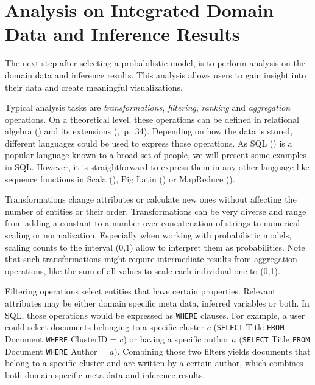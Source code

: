 \section{Analysis on Integrated Domain Data and Inference Results}

The next step after selecting a probabilistic model, is to perform analysis on the domain data and inference results. This analysis allows users to gain insight into their data and create meaningful visualizations.

Typical analysis tasks are \emph{transformations}, \emph{filtering}, \emph{ranking} and \emph{aggregation} operations. On a theoretical level, these operations can be defined in relational algebra (\cite{ozsoyouglu1987extending, klug1982equivalence}) and its extensions (\cite{rajaraman2011mining},~p.~34). Depending on how the data is stored, different languages could be used to express those operations. As SQL (\cite{iso2011sql}) is a popular language known to a broad set of people, we will present some examples in SQL. However, it is straightforward to express them in any other language like sequence functions in Scala (\cite{odersky2008programming}), Pig Latin (\cite{gates2011programming}) or MapReduce (\cite{dean2008mapreduce}).

Transformations change attributes or calculate new ones without affecting the number of entities or their order. Transformations can be very diverse and range from adding a constant to a number over concatenation of strings to numerical scaling or normalization. Especially when working with probabilistic models, scaling counts to the interval (0,1) allow to interpret them as probabilities. Note that such transformations might require intermediate results from aggregation operations, like the sum of all values to scale each individual one to (0,1).

Filtering operations select entities that have certain properties. Relevant attributes may be either domain specific meta data, inferred variables or both. In SQL, those operations would be expressed as \texttt{WHERE} clauses. For example, a user could select documents belonging to a specific cluster $c$ (\texttt{SELECT} Title \texttt{FROM} Document \texttt{WHERE} ClusterID = $c$) or having a specific author $a$ (\texttt{SELECT} Title \texttt{FROM} Document \texttt{WHERE} Author = $a$). Combining those two filters yields documents that belong to a specific cluster and are written by a certain author, which combines both domain specific meta data and inference results.

